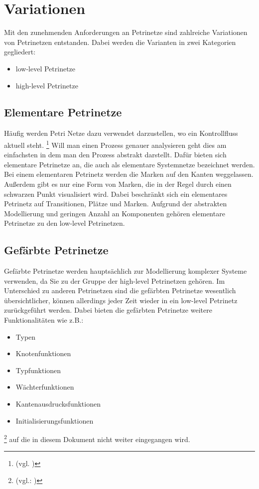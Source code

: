 \section{Variationen}
	Mit den zunehmenden Anforderungen an Petrinetze sind zahlreiche Variationen von Petrinetzen entstanden.
	Dabei werden die Varianten in zwei Kategorien gegliedert:
	\begin{itemize}
	    \item low-level Petrinetze
	    \item high-level Petrinetze
	\end{itemize}

	\subsection{Elementare Petrinetze}
		Häufig werden Petri Netze dazu verwendet darzustellen, wo ein Kontrollfluss aktuell steht. \footnote{(vgl. \cite[Seite 39]{hu_berlin:petrinetze})}
		Will man einen Prozess genauer analysieren geht dies am einfachsten in dem man den Prozess abstrakt darstellt.
		Dafür bieten sich elementare Petrinetze an, die auch als elementare Systemnetze bezeichnet werden.\\
		Bei einem elementaren Petrinetz werden die Marken auf den Kanten weggelassen. Außerdem gibt es nur eine Form von Marken, die in der Regel durch einen schwarzen Punkt \textbullet visualisiert wird.
		Dabei beschränkt sich ein elementares Petrinetz auf Transitionen, Plätze und Marken.
		Aufgrund der abstrakten Modellierung und geringen Anzahl an Komponenten gehören elementare Petrinetze zu den low-level Petrinetzen.

	\subsection{Gefärbte Petrinetze}
		Gefärbte Petrinetze werden hauptsächlich zur Modellierung komplexer Systeme verwenden, da Sie zu der Gruppe der high-level Petrinetzen gehören.
		Im Unterschied zu anderen Petrinetzen sind die gefärbten Petrinetze wesentlich übersichtlicher, können allerdings jeder Zeit wieder in ein low-level Petrinetz zurückgeführt werden.
		Dabei bieten die gefärbten Petrinetze weitere Funktionalitäten wie z.B.:
		\begin{itemize}
		    \item Typen
		    \item Knotenfunktionen
		    \item Typfunktionen
		    \item Wächterfunktionen
		    \item Kantenausdrucksfunktionen
		    \item Initialisierungsfunktionen
		\end{itemize}
		\footnote{(vgl.: \cite{tu_dresden:petrinetze})}
		auf die in diesem Dokument nicht weiter eingegangen wird.

